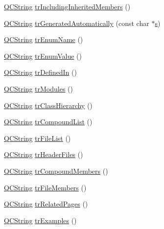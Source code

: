 \begin{DoxyCompactItemize}
\item 
\hyperlink{class_q_c_string}{Q\+C\+String} \hyperlink{class_translator_polish_a1a4e6470756f228d2393106764fd72bb}{tr\+Including\+Inherited\+Members} ()
\item 
\hyperlink{class_q_c_string}{Q\+C\+String} \hyperlink{class_translator_polish_a0ac0faca1141da2427d0f0f8fa2cd798}{tr\+Generated\+Automatically} (const char $\ast$\hyperlink{060__command__switch_8tcl_a011c73f2dbb87635a3b4206c72355f6e}{s})
\item 
\hyperlink{class_q_c_string}{Q\+C\+String} \hyperlink{class_translator_polish_ab8fccd21d327bd70d9f391bf84e052c5}{tr\+Enum\+Name} ()
\item 
\hyperlink{class_q_c_string}{Q\+C\+String} \hyperlink{class_translator_polish_a1a96005738f33bd7724413dfcfb555f7}{tr\+Enum\+Value} ()
\item 
\hyperlink{class_q_c_string}{Q\+C\+String} \hyperlink{class_translator_polish_ab629c2f61dfc9c5c0999c0121afd5f8a}{tr\+Defined\+In} ()
\item 
\hyperlink{class_q_c_string}{Q\+C\+String} \hyperlink{class_translator_polish_a8119325d06437d3a3b76a0b4546927fc}{tr\+Modules} ()
\item 
\hyperlink{class_q_c_string}{Q\+C\+String} \hyperlink{class_translator_polish_a03be7582d6855399a38f76901e0b8f89}{tr\+Class\+Hierarchy} ()
\item 
\hyperlink{class_q_c_string}{Q\+C\+String} \hyperlink{class_translator_polish_ada057fd3ef44bcd29f2048b79089417e}{tr\+Compound\+List} ()
\item 
\hyperlink{class_q_c_string}{Q\+C\+String} \hyperlink{class_translator_polish_a338ca2e1ddddafaa41338ca875bee281}{tr\+File\+List} ()
\item 
\hyperlink{class_q_c_string}{Q\+C\+String} \hyperlink{class_translator_polish_a748d9793a3a011afa12158c3a4d63f8e}{tr\+Header\+Files} ()
\item 
\hyperlink{class_q_c_string}{Q\+C\+String} \hyperlink{class_translator_polish_ae99640a160ae514a3bfde7b92802d880}{tr\+Compound\+Members} ()
\item 
\hyperlink{class_q_c_string}{Q\+C\+String} \hyperlink{class_translator_polish_ac61982acc3dc6c319991f92d1667a638}{tr\+File\+Members} ()
\item 
\hyperlink{class_q_c_string}{Q\+C\+String} \hyperlink{class_translator_polish_af2a7974597c3756f42cf593cadba6920}{tr\+Related\+Pages} ()
\item 
\hyperlink{class_q_c_string}{Q\+C\+String} \hyperlink{class_translator_polish_a3a9406c85bbeccb8e01f6ea4faa88d6e}{tr\+Examples} ()

\end{DoxyCompactItemize}
